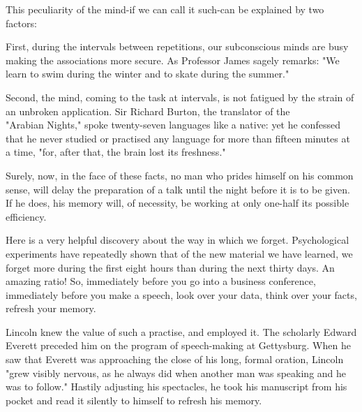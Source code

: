\documentclass[10pt]{article}
\begin{document}
This peculiarity of the mind-if we can call it such-can be explained by two factors:

First, during the intervals between repetitions, our subconscious minds are busy making the associations more secure. As Professor James sagely remarks: "We learn to swim during the winter and to skate during the summer."

Second, the mind, coming to the task at intervals, is not fatigued by the strain of an unbroken application. Sir Richard Burton, the translator of the\\
"Arabian Nights," spoke twenty-seven languages like a native: yet he confessed that he never studied or practised any language for more than fifteen minutes at a time, "for, after that, the brain lost its freshness."

Surely, now, in the face of these facts, no man who prides himself on his common sense, will delay the preparation of a talk until the night before it is to be given. If he does, his memory will, of necessity, be working at only one-half its possible efficiency.

Here is a very helpful discovery about the way in which we forget. Psychological experiments have repeatedly shown that of the new material we have learned, we forget more during the first eight hours than during the next thirty days. An amazing ratio! So, immediately before you go into a business conference, immediately before you make a speech, look over your data, think over your facts, refresh your memory.

Lincoln knew the value of such a practise, and employed it. The scholarly Edward Everett preceded him on the program of speech-making at Gettysburg. When he saw that Everett was approaching the close of his long, formal oration, Lincoln "grew visibly nervous, as he always did when another man was speaking and he was to follow." Hastily adjusting his spectacles, he took his manuscript from his pocket and read it silently to himself to refresh his memory.
\end{document}
